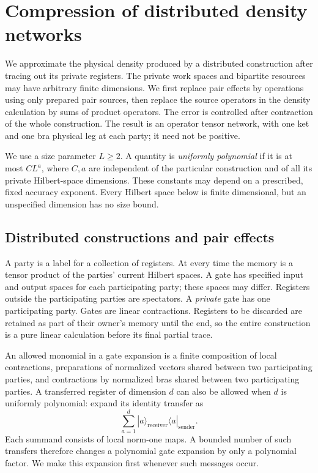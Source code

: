 \section{Compression of distributed density networks}
\label{sec:compression}

We approximate the physical density produced by a distributed construction
after tracing out its private registers.  The private work spaces and
bipartite resources may have arbitrary finite dimensions.  We first replace
pair effects by operations using only prepared pair sources, then replace
the source operators in the density calculation by sums of product
operators.  The error is
controlled after contraction of the whole construction.  The result is an
operator tensor network, with one ket and one bra physical leg at each
party; it need not be positive.

We use a size parameter $L\ge2$.  A quantity is \emph{uniformly polynomial}
if it is at most $C L^a$, where $C,a$ are independent of the particular
construction and of all its private Hilbert-space dimensions.  These
constants may depend on a prescribed, fixed accuracy exponent.  Every
Hilbert space below is finite dimensional, but an unspecified dimension
has no size bound.

\subsection{Distributed constructions and pair effects}

A party is a label for a collection of registers.  At every time the
memory is a tensor product of the parties' current Hilbert spaces.  A
gate has specified input and output spaces for each participating party;
these spaces may differ.  Registers outside the participating parties
are spectators.  A \emph{private} gate has one participating party.
Gates are linear contractions.  Registers to be discarded are retained
as part of their owner's memory until the end, so the entire construction
is a pure linear calculation before its final partial trace.

An allowed monomial in a gate expansion is a finite composition of local
contractions, preparations of normalized vectors shared between two
participating parties, and contractions by normalized bras shared
between two participating parties.  A transferred register of dimension
$d$ can also be allowed when $d$ is uniformly polynomial: expand its
identity transfer as
\[
 \sum_{a=1}^{d}|a\rangle_{\mathrm{receiver}}
                 \langle a|_{\mathrm{sender}}.
\]
Each summand consists of local norm-one maps.  A bounded number of such
transfers therefore changes a polynomial gate expansion by only a
polynomial factor.  We make this expansion first whenever such messages
occur.

